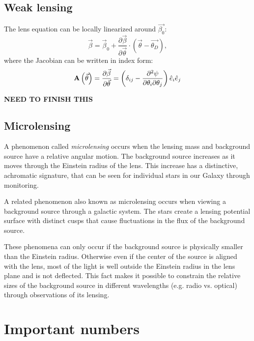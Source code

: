 \subsection{Weak lensing}

The lens equation can be locally linearized  around $\vec{\beta_0}$:
\begin{equation}
\vec{\beta} = \vec{\beta}_0
+ \frac{\partial \vec{\beta}}{\partial \vec{\theta}} \cdot \left(\vec{\theta}
- \vec{\theta_D} \right), 
\end{equation}
where the Jacobian can be written in index form:
\begin{equation}
{\bf A}\left(\vec{\theta}\right) = 
\frac{\partial \vec{\beta}}{\partial \vec{\theta}} = \left(\delta_{ij}
- \frac{\partial^2 \psi}{\partial\theta_i \partial\theta_j}\right)
{\hat e}_i {\hat e}_j
\end{equation}

{\bf NEED TO FINISH THIS}

\subsection{Microlensing}

A phenomenon called {\it microlensing} occurs when the lensing mass
and background source have a relative angular motion. The background
source increases as it moves through the Einstein radius of the
lens. This increase has a distinctive, achromatic signature, that can
be seen for individual stars in our Galaxy through monitoring.

A related phenomenon also known as microlensing occurs when viewing a
background source through a galactic system. The stars create a
lensing potential surface with distinct cusps that cause fluctuations
in the flux of the background source.

These phenomena can only occur if the background source is physically
smaller than the Einstein radius. Otherwise even if the center of the
source is aligned with the lens, most of the light is well outside the
Einstein radius in the lens plane and is not deflected. This fact
makes it possible to constrain the relative sizes of the background
source in different wavelengths (e.g. radio vs. optical) through
observations of its lensing.

\section{Important numbers}

